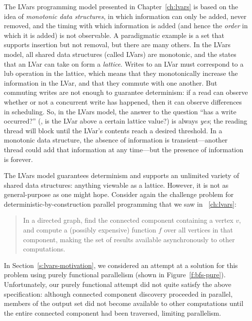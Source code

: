 \ifdefined\DISSERTATION
The LVars programming model presented in Chapter~\ref{ch:lvars} is
based on the idea of \emph{monotonic data structures}, in which
information can only be added, never removed, and the timing with
which information is added (and hence the \emph{order} in which it is
added) is not observable.  A paradigmatic example is a set that
supports insertion but not removal, but there are many others.  In the
LVars model, all shared data structures (called LVars) are monotonic,
and the states that an LVar can take on form a \emph{lattice}.  Writes
to an LVar must correspond to a lub operation in the lattice, which
means that they monotonically increase the information in the LVar,
and that they commute with one another.  But commuting writes are not
enough to guarantee determinism: if a read can observe whether or not
a concurrent write has happened, then it can observe differences in
scheduling.  So, in the LVars model, the answer to the question ``has
a write occurred?''  (\ie, is the LVar above a certain lattice value?)
is always
\emph{yes}; the reading thread will block until the LVar's contents
reach a desired threshold.  In a monotonic data structure, the absence
of information is transient---another thread could add that
information at any time---but the presence of information is forever.
\fi

The LVars model  guarantees determinism and supports an unlimited
variety of shared data structures: anything viewable as a lattice.
However, it is not as general-purpose as one might hope.  Consider
again the challenge problem for deterministic-by-construction parallel
programming that we saw in ~\ref{ch:lvars}:
\begin{quote}
  In a directed graph, find the connected component containing a
  vertex $v$, and compute a (possibly expensive) function $f$ over all
  vertices in that component, making the set of results available
  asynchronously to other computations.
\end{quote}
In Section~\ref{s:lvars-motivation}, we considered an attempt at a
solution for this problem using purely functional parallelism (shown
in Figure~\ref{f:bfs-pure}).  Unfortunately, our purely functional
attempt did not quite satisfy the above specification: although
connected component discovery proceeded in parallel, members of the
output set did not become available to other computations until the
entire connected component had been traversed, limiting parallelism.

